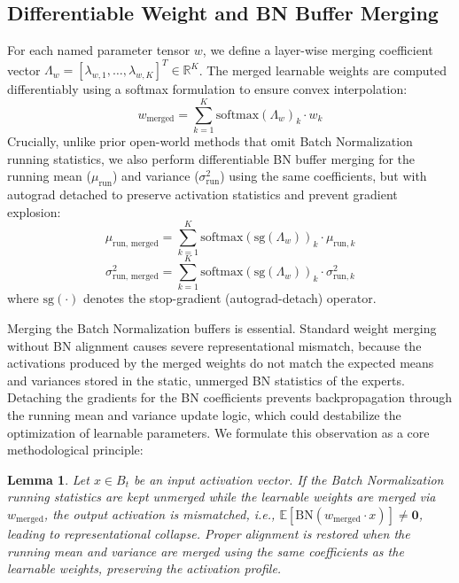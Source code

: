 \documentclass{article}
\theoremstyle{plain}
\newtheorem{lemma}[theorem]{Lemma}
\theoremstyle{definition}
\theoremstyle{remark}
\begin{document}
\subsection{Differentiable Weight and BN Buffer Merging}
For each named parameter tensor $w$, we define a layer-wise merging coefficient vector $\Lambda_w = [\lambda_{w, 1}, \dots, \lambda_{w, K}]^T \in \mathbb{R}^K$. The merged learnable weights are computed differentiably using a softmax formulation to ensure convex interpolation:
\begin{equation}
\label{eq:weight_merge}
    w_{\text{merged}} = \sum_{k=1}^K \text{softmax}(\Lambda_w)_k \cdot w_k
\end{equation}
Crucially, unlike prior open-world methods that omit Batch Normalization running statistics, we also perform differentiable BN buffer merging for the running mean ($\mu_{\text{run}}$) and variance ($\sigma^2_{\text{run}}$) using the same coefficients, but with autograd detached to preserve activation statistics and prevent gradient explosion:
\begin{equation}
\label{eq:bn_merge}
    \mu_{\text{run, merged}} = \sum_{k=1}^K \text{softmax}(\text{sg}(\Lambda_w))_k \cdot \mu_{\text{run}, k}
\end{equation}
\begin{equation}
    \sigma^2_{\text{run, merged}} = \sum_{k=1}^K \text{softmax}(\text{sg}(\Lambda_w))_k \cdot \sigma^2_{\text{run}, k}
\end{equation}
where $\text{sg}(\cdot)$ denotes the stop-gradient (autograd-detach) operator.

Merging the Batch Normalization buffers is essential. Standard weight merging without BN alignment causes severe representational mismatch, because the activations produced by the merged weights do not match the expected means and variances stored in the static, unmerged BN statistics of the experts. Detaching the gradients for the BN coefficients prevents backpropagation through the running mean and variance update logic, which could destabilize the optimization of learnable parameters. We formulate this observation as a core methodological principle:

\begin{lemma}
\label{lemma:bn_align}
Let $x \in B_t$ be an input activation vector. If the Batch Normalization running statistics are kept unmerged while the learnable weights are merged via $w_{\text{merged}}$, the output activation is mismatched, i.e., $\mathbb{E}[\text{BN}(w_{\text{merged}} \cdot x)] \neq \mathbf{0}$, leading to representational collapse. Proper alignment is restored when the running mean and variance are merged using the same coefficients as the learnable weights, preserving the activation profile.
\end{lemma}
\end{document}
